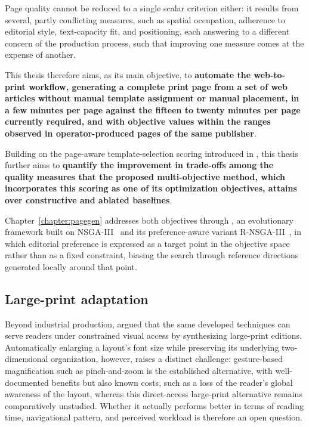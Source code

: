 Page quality cannot be reduced to a single scalar criterion either: it results from several, partly conflicting measures, such as spatial occupation, adherence to editorial style, text-capacity fit, and positioning, each answering to a different concern of the production process, such that improving one measure comes at the expense of another. 

This thesis therefore aims, as its main objective, to \textbf{automate the \melody web-to-print workflow, generating a complete print page from a set of web articles without manual template assignment or manual placement, in a few minutes per page against the fifteen to twenty minutes per page currently required, and with objective values within the ranges observed in operator-produced pages of the same publisher}. 

Building on the page-aware template-selection scoring introduced in , this thesis further aims to \textbf{quantify the improvement in trade-offs among the quality measures that the proposed multi-objective method, which incorporates this scoring as one of its optimization objectives, attains over constructive and ablated baselines}. 

Chapter~\ref{chapter:pagegen} addresses both objectives through \methodNameGeneral, an evolutionary framework built on NSGA-III~\cite{nsga-iii-pt1, nsga-iii-pt2} and its preference-aware variant R-NSGA-III~\cite{rnsga-iii}, in which editorial preference is expressed as a target point in the objective space rather than as a fixed constraint, biasing the search through reference directions generated locally around that point.

\subsection{Large-print adaptation}
\label{sec:large-print-adaptation}

Beyond industrial production,  argued that the same developed techniques can serve readers under constrained visual access by synthesizing large-print editions. Automatically enlarging a layout's font size while preserving its underlying two-dimensional organization, however, raises a distinct challenge: gesture-based magnification such as pinch-and-zoom is the established alternative, with well-documented benefits but also known costs, such as a loss of the reader's global awareness of the layout, whereas this direct-access large-print alternative remains comparatively unstudied. Whether it actually performs better in terms of reading time, navigational pattern, and perceived workload is therefore an open question.

